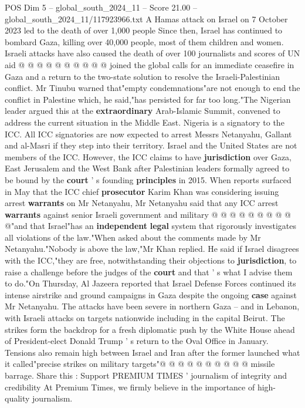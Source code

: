 \begin{textsample}{POS Dim 5 – global\_south\_2024\_11 – Score 21.00 – global\_south\_2024\_11/117923966.txt}
A Hamas attack on Israel on 7 October 2023 led to the death of over 1,000 people Since then, Israel has continued to bombard Gaza, killing over 40,000 people, most of them children and women.
Israeli attacks have also caused the death of over 100 journalists and scores of UN aid @ @ @ @ @ @ @ @ @ @ joined the global calls for an immediate ceasefire in Gaza and a return to the two-state solution to resolve the Israeli-Palestinian conflict.
Mr Tinubu warned that"empty condemnations"are not enough to end the conflict in Palestine which, he said,"has persisted for far too long."The Nigerian leader argued this at the \textbf{extraordinary} Arab-Islamic Summit, convened to address the current situation in the Middle East.
Nigeria is a signatory to the ICC.
All ICC signatories are now expected to arrest Messrs Netanyahu, Gallant and al-Masri if they step into their territory.
Israel and the United States are not members of the ICC.
However, the ICC claims to have \textbf{jurisdiction} over Gaza, East Jerusalem and the West Bank after Palestinian leaders formally agreed to be bound by the \textbf{court} ' s founding \textbf{principles} in 2015.
When reports surfaced in May that the ICC chief \textbf{prosecutor} Karim Khan was considering issuing arrest \textbf{warrants} on Mr Netanyahu, Mr Netanyahu said that any ICC arrest \textbf{warrants} against senior Israeli government and military @ @ @ @ @ @ @ @ @ @"and that Israel"has an \textbf{independent} \textbf{legal} system that rigorously investigates all violations of the law."When asked about the comments made by Mr Netanyahu."Nobody is above the law,"Mr Khan replied.
He said if Israel disagrees with the ICC,"they are free, notwithstanding their objections to \textbf{jurisdiction}, to raise a challenge before the judges of the \textbf{court} and that ' s what I advise them to do."On Thursday, Al Jazeera reported that Israel Defense Forces continued its intense airstrike and ground campaigns in Gaza despite the ongoing \textbf{case} against Mr Netanyahu.
The attacks have been severe in northern Gaza -- and in Lebanon, with Israeli attacks on targets nationwide including in the capital Beirut.
The strikes form the backdrop for a fresh diplomatic push by the White House ahead of President-elect Donald Trump ' s return to the Oval Office in January.
Tensions also remain high between Israel and Iran after the former launched what it called"precise strikes on military targets"@ @ @ @ @ @ @ @ @ @ missile barrage.
Share this : Support PREMIUM TIMES ' journalism of integrity and credibility At Premium Times, we firmly believe in the importance of high-quality journalism.

\end{textsample}
